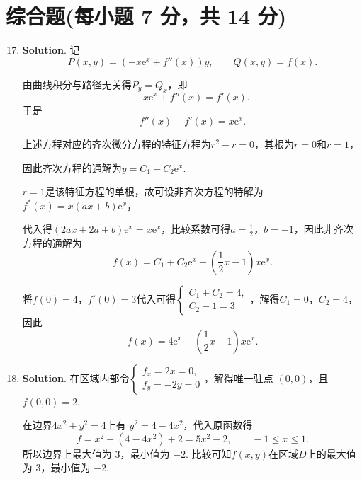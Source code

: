 \documentclass[../Main.tex]{subfiles}
\begin{document}
\section{综合题(每小题 7 分，共 14 分)}
\begin{enumerate}
  \setcounter{enumi}{16}
  \item \textbf{Solution}. 记
        \[
          P(x,y)=(-x\mathrm{e}^{x}+f''(x))y,\qquad Q(x,y)=f(x).
        \]

        由曲线积分与路径无关得$P_y=Q_x$，即
        \[
          -x\mathrm{e}^{x}+f''(x)=f'(x).
        \]
        于是
        \[
          f''(x)-f'(x)=x\mathrm{e}^{x}.
        \]

        上述方程对应的齐次微分方程的特征方程为$r^2-r=0$，其根为\(r=0\)和\(r=1\)，

        因此齐次方程的通解为$y=C_1+C_2\mathrm{e}^x$.

        $r=1$是该特征方程的单根，故可设非齐次方程的特解为$f^*(x)=x(ax+b)\mathrm{e}^{x}$，

        代入得$(2ax+2a+b)\mathrm{e}^x=x\mathrm{e}^{x}$，比较系数可得$a=\frac{1}{2}$，$b=-1$，因此非齐次方程的通解为
        \[
          f(x)=C_1+C_2\mathrm{e}^x+\left(\frac{1}{2}x-1\right)x\mathrm{e}^x.
        \]

        将$f(0)=4$，$f'(0)=3$代入可得$\begin{cases}
            C_1+C_2=4, \\
            C_2-1=3
          \end{cases}$，解得$C_1=0$，$C_2=4$，因此
        \[
          f(x)=4\mathrm{e}^x+\left(\frac{1}{2}x-1\right)x\mathrm{e}^x.
        \]

  \item \textbf{Solution}. 在区域内部令$\begin{cases}
            f_x=2x=0, \\
            f_y=-2y=0
          \end{cases}$，解得唯一驻点 \((0,0)\)，且$f(0,0)=2$.

        在边界$4x^2+y^2=4$上有 \(y^2=4-4x^2\)，代入原函数得
        \[
          f=x^2-(4-4x^2)+2=5x^2-2,\qquad -1\le x\le 1.
        \]
        所以边界上最大值为 \(3\)，最小值为 \(-2\). 比较可知$f(x,y)$在区域$D$上的最大值为 \(3\)，最小值为 \(-2\).
\end{enumerate}
\end{document}
